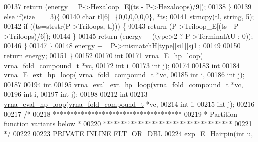 \begin{DoxyCode}
00137         \textcolor{keywordflow}{return} (energy = P->Hexaloop\_E[(ts - P->Hexaloops)/9]);
00138     \}
00139     \textcolor{keywordflow}{else} \textcolor{keywordflow}{if}(size == 3)\{
00140       \textcolor{keywordtype}{char} tl[6]=\{0,0,0,0,0,0\}, *ts;
00141       strncpy(tl, \textcolor{keywordtype}{string}, 5);
00142       \textcolor{keywordflow}{if} ((ts=strstr(P->Triloops, tl))) \{
00143         \textcolor{keywordflow}{return} (P->Triloop\_E[(ts - P->Triloops)/6]);
00144       \}
00145       \textcolor{keywordflow}{return} (energy + (type>2 ? P->TerminalAU : 0));
00146     \}
00147   \}
00148   energy += P->mismatchH[type][si1][sj1];
00149 
00150   \textcolor{keywordflow}{return} energy;
00151 \}
00152 
00170 \textcolor{keywordtype}{int}
00171 \hyperlink{group__loops_ga999ba163a8148d72fd5f22819a681df7}{vrna\_E\_hp\_loop}( \hyperlink{group__fold__compound_structvrna__fc__s}{vrna\_fold\_compound\_t} *vc,
00172                 \textcolor{keywordtype}{int} i,
00173                 \textcolor{keywordtype}{int} j);
00174 
00183 \textcolor{keywordtype}{int}
00184 \hyperlink{group__loops_gac3393ee309372eccae944e3a07f455f9}{vrna\_E\_ext\_hp\_loop}( \hyperlink{group__fold__compound_structvrna__fc__s}{vrna\_fold\_compound\_t} *vc,
00185                     \textcolor{keywordtype}{int} i,
00186                     \textcolor{keywordtype}{int} j);
00187 
00194 \textcolor{keywordtype}{int}
00195 \hyperlink{group__eval_gad3b92453a6b501856eec8fae39f3235d}{vrna\_eval\_ext\_hp\_loop}(\hyperlink{group__fold__compound_structvrna__fc__s}{vrna\_fold\_compound\_t} *vc,
00196                       \textcolor{keywordtype}{int} i,
00197                       \textcolor{keywordtype}{int} j);
00198 
00212 \textcolor{keywordtype}{int}
00213 \hyperlink{group__eval_gab3eb4651dc26dc2b653a57dd340d7e68}{vrna\_eval\_hp\_loop}(\hyperlink{group__fold__compound_structvrna__fc__s}{vrna\_fold\_compound\_t} *vc,
00214                   \textcolor{keywordtype}{int} i,
00215                   \textcolor{keywordtype}{int} j);
00216 
00217 \textcolor{comment}{/*}
00218 \textcolor{comment}{*************************************}
00219 \textcolor{comment}{* Partition function variants below *}
00220 \textcolor{comment}{*************************************}
00221 \textcolor{comment}{*/}
00222 
00223 PRIVATE INLINE \hyperlink{group__data__structures_ga31125aeace516926bf7f251f759b6126}{FLT\_OR\_DBL}
\hypertarget{hairpin__loops_8h_source.tex_l00224}{}\hyperlink{group__loops_ga51fb555974f180b78d76142b2894851c}{00224} \hyperlink{group__loops_ga51fb555974f180b78d76142b2894851c}{exp\_E\_Hairpin}(\textcolor{keywordtype}{int} u,

\end{DoxyCode}
